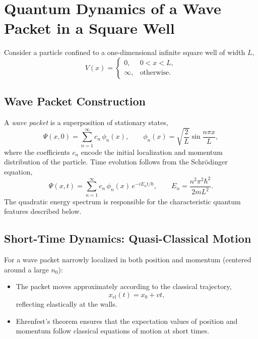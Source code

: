 \section{Quantum Dynamics of a Wave Packet in a Square Well}

Consider a particle confined to a one-dimensional infinite square well of width $L$,
\begin{equation}
V(x) = 
\begin{cases}
0, & 0 < x < L,\\
\infty, & \text{otherwise}.
\end{cases}
\end{equation}

\subsection{Wave Packet Construction}

A \emph{wave packet} is a superposition of stationary states,
\begin{equation}
\Psi(x,0) = \sum_{n=1}^{\infty} c_n \, \phi_n(x), 
\qquad
\phi_n(x) = \sqrt{\frac{2}{L}} \sin \frac{n \pi x}{L},
\end{equation}
where the coefficients $c_n$ encode the initial localization and momentum distribution of the particle.  
Time evolution follows from the Schr\"odinger equation,
\begin{equation}
\Psi(x,t) = \sum_{n=1}^{\infty} c_n \, \phi_n(x) \, e^{-i E_n t/\hbar}, 
\qquad
E_n = \frac{n^2 \pi^2 \hbar^2}{2 m L^2}.
\end{equation}
The quadratic energy spectrum is responsible for the characteristic quantum features described below.

\subsection{Short-Time Dynamics: Quasi-Classical Motion}

For a wave packet narrowly localized in both position and momentum (centered around a large $n_0$):
\begin{itemize}
    \item The packet moves approximately according to the classical trajectory,
    \begin{equation}
    x_{\mathrm{cl}}(t) = x_0 + v t,
    \end{equation}
    reflecting elastically at the walls.
    \item Ehrenfest's theorem ensures that the expectation values of position and momentum follow classical equations of motion at short times.
\end{itemize}


